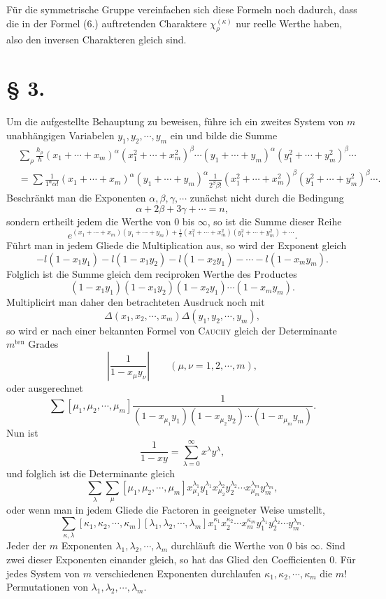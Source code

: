 \documentclass[11pt]{article}
\newcommand{\ten}{\mathrm{ten}}
\begin{document}
Für die symmetrische Gruppe vereinfachen sich diese Formeln noch dadurch, dass die in der Formel (6.) auftretenden Charaktere $\chi_\rho^{(\kappa)}$ nur reelle Werthe haben, also den inversen Charakteren gleich sind.

\section*{§ 3.}

Um die aufgestellte Behauptung zu beweisen, führe ich ein zweites System von $m$ unabhängigen Variabelen $y_1,y_2,\cdots,y_m$ ein und bilde die Summe
\begin{equation}\tag{1.}
\begin{aligned}
 &\sum_\rho \frac{h_\rho}{h}(x_1+\cdots+x_m)^\alpha(x_1^2+\cdots+x_m^2)^\beta\cdots
 (y_1+\cdots+y_m)^\alpha(y_1^2+\cdots+y_m^2)^\beta\cdots\\
 &=\sum \frac{1}{1^\alpha\alpha!}(x_1+\cdots+x_m)^\alpha(y_1+\cdots+y_m)^\alpha
 \frac{1}{2^\beta\beta!}(x_1^2+\cdots+x_m^2)^\beta(y_1^2+\cdots+y_m^2)^\beta\cdots .
\end{aligned}
\end{equation}
Beschränkt man die Exponenten $\alpha,\beta,\gamma,\cdots$ zunächst nicht durch die Bedingung
\begin{equation}\tag{2.}
 \alpha+2\beta+3\gamma+\cdots=n,
\end{equation}
sondern ertheilt jedem die Werthe von $0$ bis $\infty$, so ist die Summe dieser Reihe
\[
 e^{(x_1+\cdots+x_m)(y_1+\cdots+y_m)+\frac12(x_1^2+\cdots+x_m^2)(y_1^2+\cdots+y_m^2)+\cdots}.
\]
Führt man in jedem Gliede die Multiplication aus, so wird der Exponent gleich
\[
 -l(1-x_1y_1)-l(1-x_1y_2)-l(1-x_2y_1)-\cdots-l(1-x_my_m).
\]
Folglich ist die Summe gleich dem reciproken Werthe des Productes
\[
 (1-x_1y_1)(1-x_1y_2)(1-x_2y_1)\cdots(1-x_my_m).
\]
Multiplicirt man daher den betrachteten Ausdruck noch mit
\[
 \Delta(x_1,x_2,\cdots,x_m)\Delta(y_1,y_2,\cdots,y_m),
\]
so wird er nach einer bekannten Formel von \textsc{Cauchy} gleich der Determinante $m^{\ten}$ Grades
\[
 \left|\frac{1}{1-x_\mu y_\nu}\right|\qquad(\mu,\nu=1,2,\cdots,m),
\]
oder ausgerechnet
\[
 \sum[\mu_1,\mu_2,\cdots,
\mu_m]\frac{1}{(1-x_{\mu_1}y_1)(1-x_{\mu_2}y_2)\cdots(1-x_{\mu_m}y_m)}.
\]
Nun ist
\[
 \frac{1}{1-xy}=\sum_{\lambda=0}^\infty x^\lambda y^\lambda,
\]
und folglich ist die Determinante gleich
\[
 \sum_\lambda\sum_\mu[\mu_1,\mu_2,\cdots,
\mu_m]x_{\mu_1}^{\lambda_1}y_1^{\lambda_1}x_{\mu_2}^{\lambda_2}y_2^{\lambda_2}\cdots x_{\mu_m}^{\lambda_m}y_m^{\lambda_m},
\]
oder wenn man in jedem Gliede die Factoren in geeigneter Weise umstellt,
\begin{equation}\tag{3.}
 \sum_{\kappa,\lambda}[\kappa_1,\kappa_2,\cdots,
\kappa_m][\lambda_1,\lambda_2,\cdots,
\lambda_m]x_1^{\kappa_1}x_2^{\kappa_2}\cdots x_m^{\kappa_m}y_1^{\lambda_1}y_2^{\lambda_2}\cdots y_m^{\lambda_m}.
\end{equation}
Jeder der $m$ Exponenten $\lambda_1,\lambda_2,\cdots,\lambda_m$ durchläuft die Werthe von $0$ bis $\infty$. Sind zwei dieser Exponenten einander gleich, so hat das Glied den Coefficienten $0$. Für jedes System von $m$ verschiedenen Exponenten durchlaufen $\kappa_1,\kappa_2,\cdots,\kappa_m$ die $m!$ Permutationen von $\lambda_1,\lambda_2,\cdots,
\lambda_m$.
\end{document}
